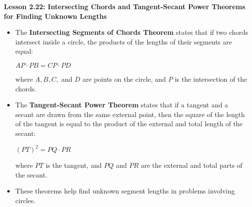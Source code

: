 \begin{center}
\textbf{Lesson 2.22: Intersecting Chords and Tangent-Secant Power Theorems for Finding Unknown Lengths}
\end{center}

\vspace*{-1.5ex}

\begin{itemize}
    \item The \textbf{Intersecting Segments of Chords Theorem} states that if two chords intersect inside a circle, the products of the lengths of their segments are equal:

{\centering $
    AP \cdot PB = CP \cdot PD
$\par}
    where $A, B, C,$ and $D$ are points on the circle, and $P$ is the intersection of the chords.
    
    \item The \textbf{Tangent-Secant Power Theorem} states that if a tangent and a secant are drawn from the same external point, then the square of the length of the tangent is equal to the product of the external and total length of the secant:

{\centering $
    (PT)^2 = PQ \cdot PR
$\par}
    where $PT$ is the tangent, and $PQ$ and $PR$ are the external and total parts of the secant.
    
    \item These theorems help find unknown segment lengths in problems involving circles.
\end{itemize}
